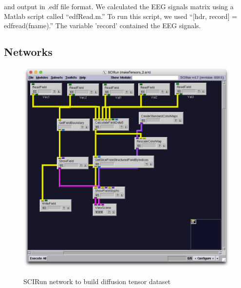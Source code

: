 and output in .edf file format. We calculated the EEG signals matrix using a Matlab script called ``edfRead.m.'' \cite{ref:edfread} To run this script, we used ``[hdr, record] = edfread(fname).'' The variable 'record' contained the EEG signals. 

\subsection{Networks}
\label{sec:networks}

\begin{figure}[p]
\begin{center}
\includegraphics[width=\textwidth]{Figures/make_DTI.png}\\
\caption{SCIRun network to build diffusion tensor dataset}
\label{fig:maketensornet}
\end{center}
\end{figure}

